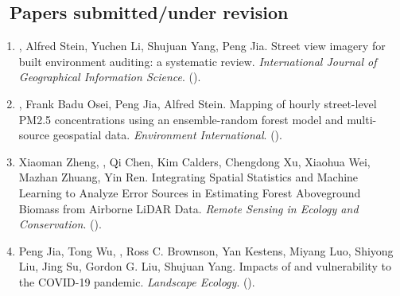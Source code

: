 \subsection*{\texorpdfstring{\faBook\ Papers submitted/under revision}{Papers submitted/under revision}}
\begin{enumerate}
\item
    \Shaoqing, Alfred Stein, Yuchen Li, Shujuan Yang, Peng Jia.
    Street view imagery for built environment auditing: a systematic review.
    \textit{International Journal of Geographical Information Science}. 
    (\Review).
\item
    \Shaoqing, Frank Badu Osei, Peng Jia, Alfred Stein.
    Mapping of hourly street-level PM2.5 concentrations using an ensemble-random forest model and multi-source geospatial data.
    \textit{Environment International}. 
    (\Submitted).
\item
    Xiaoman Zheng, \Shaoqing, Qi Chen, Kim Calders, Chengdong Xu, Xiaohua Wei, Mazhan Zhuang, Yin Ren.
    Integrating Spatial Statistics and Machine Learning to Analyze Error Sources in Estimating Forest Aboveground Biomass from Airborne LiDAR Data.
    \textit{Remote Sensing in Ecology and Conservation}. 
    (\Revision).
\item
    Peng Jia, Tong Wu, \Shaoqing, Ross C. Brownson, Yan Kestens, Miyang Luo, Shiyong Liu,  Jing Su, Gordon G. Liu, Shujuan Yang.
    Impacts of and vulnerability to the COVID-19 pandemic.
    \textit{Landscape Ecology}. 
    (\Submitted).
\end{enumerate}